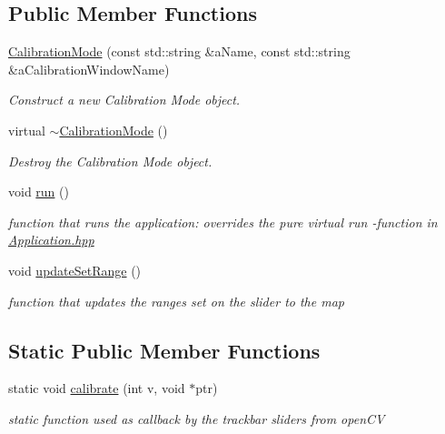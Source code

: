 \subsection*{Public Member Functions}
\begin{DoxyCompactItemize}
\item 
\hyperlink{classCalibrationMode_ac8097b7c6be431d80afad99d3adb73ad}{Calibration\+Mode} (const std\+::string \&a\+Name, const std\+::string \&a\+Calibration\+Window\+Name)
\begin{DoxyCompactList}\small\item\em Construct a new Calibration Mode object. \end{DoxyCompactList}\item 
virtual \hyperlink{classCalibrationMode_a1afa1c5b72412c2b07eb3d508582d366}{$\sim$\+Calibration\+Mode} ()\hypertarget{classCalibrationMode_a1afa1c5b72412c2b07eb3d508582d366}{}\label{classCalibrationMode_a1afa1c5b72412c2b07eb3d508582d366}

\begin{DoxyCompactList}\small\item\em Destroy the Calibration Mode object. \end{DoxyCompactList}\item 
void \hyperlink{classCalibrationMode_a4170e6320aaa744f819340a0064076b9}{run} ()\hypertarget{classCalibrationMode_a4170e6320aaa744f819340a0064076b9}{}\label{classCalibrationMode_a4170e6320aaa744f819340a0064076b9}

\begin{DoxyCompactList}\small\item\em function that runs the application\+: overrides the pure virtual run -\/function in \hyperlink{Application_8hpp_source}{Application.\+hpp} \end{DoxyCompactList}\item 
void \hyperlink{classCalibrationMode_ad3c3850c2ed080d299f6e4e5a3e1cd87}{update\+Set\+Range} ()\hypertarget{classCalibrationMode_ad3c3850c2ed080d299f6e4e5a3e1cd87}{}\label{classCalibrationMode_ad3c3850c2ed080d299f6e4e5a3e1cd87}

\begin{DoxyCompactList}\small\item\em function that updates the ranges set on the slider to the map \end{DoxyCompactList}\end{DoxyCompactItemize}
\subsection*{Static Public Member Functions}
\begin{DoxyCompactItemize}
\item 
static void \hyperlink{classCalibrationMode_a9b78a49f8a37355e1563d5f4f52b0136}{calibrate} (int v, void $\ast$ptr)
\begin{DoxyCompactList}\small\item\em static function used as callback by the trackbar sliders from open\+CV \end{DoxyCompactList}\end{DoxyCompactItemize}
